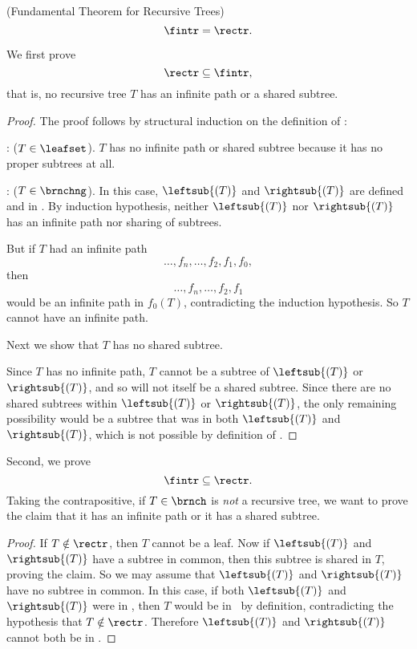 \begin{definition}
\begin{theorem}\label{fundthmrec}(Fundamental Theorem for Recursive Trees)
\[
\fintr = \rectr.
\]
\end{theorem}

We first prove
\begin{equation}\label{rectrsubfintr}
\rectr \subseteq \fintr,
\end{equation}
that is, no recursive tree $T$ has an infinite path or a shared subtree.

\begin{proof}
The proof follows by structural induction on the
definition of \rectr:

: ($T \in \leafset$).  $T$ has no infinite path
or shared subtree because it has no proper subtrees at all.

: ($T \in \brnchng$).  In this case,
$\leftsub{(T)}$ and $\rightsub{(T)}$ are defined and in \rectr.  By
induction hypothesis, neither $\leftsub{(T)}$ nor $\rightsub{(T)}$ has an
infinite path nor sharing of subtrees.

But if $T$ had an infinite path
\[
\dots,f_n,\dots, f_2,f_1,f_0,
\]
then
\begin{equation}\label{dfnf2f1}
\dots,f_n,\dots,f_2,f_1
\end{equation}
would be an infinite path in $f_0(T)$, contradicting the induction
hypothesis.  So $T$ cannot have an infinite path.

Next we show that $T$ has no shared subtree.

Since $T$ has no infinite path, $T$ cannot be a subtree of
$\leftsub{(T)}$ or $\rightsub{(T)}$, and so will not itself be a
shared subtree.  Since there are no shared subtrees within
$\leftsub{(T)}$ or $\rightsub{(T)}$, the only remaining possibility
would be a subtree that was in both $\leftsub{(T)}$ and
$\rightsub{(T)}$, which is not possible by definition of \rectr.
\end{proof}

Second, we prove
\begin{equation}\label{fintrsubrectr}
\fintr \subseteq \rectr.
\end{equation}
Taking the contrapositive, if $T \in \brnch$ is \emph{not} a recursive
tree, we want to prove the claim that it has an infinite path or it
has a shared subtree.

\begin{proof}
If $T \notin \rectr$, then $T$ cannot be a leaf.  Now if
$\leftsub{(T)}$ and $\rightsub{(T)}$ have a subtree in common, then
this subtree is shared in $T$, proving the claim.  So we may assume
that $\leftsub{(T)}$ and $\rightsub{(T)}$ have no subtree in common.
In this case, if both $\leftsub{(T)}$ and $\rightsub{(T)}$ were in
\rectr, then $T$ would be in \rectr\ by definition, contradicting the
hypothesis that $T \notin \rectr$.  Therefore $\leftsub{(T)}$ and
$\rightsub{(T)}$ cannot both be in \rectr.


\end{proof}
\end{definition}
